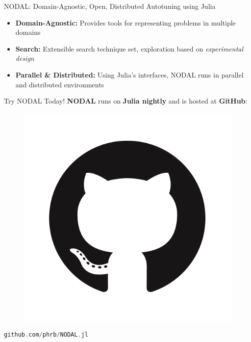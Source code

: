 \documentclass{beamer}
\begin{document}
\begin{frame}[fragile]
\begin{columns}[t]
\begin{column}{.48\linewidth}
\begin{block}{\Large NODAL: Domain-Agnostic, Open, Distributed
            Autotuning using Julia}
            \begin{itemize}
                \justifying\item \textbf{Domain-Agnostic:} Provides tools for representing
                    problems in multiple domains
                \justifying\item \textbf{Search:} Extensible search technique set,
                    exploration based on \emph{experimental design}
                \justifying\item \textbf{Parallel \& Distributed:} Using Julia's interfaces,
                    NODAL runs in parallel and distributed environments
            \end{itemize}
        \end{block}
        \begin{block}{\Large Try NODAL Today!}
            \justifying
            \large
            \textbf{NODAL} runs on \textbf{Julia nightly}
            and is hosted at \textbf{GitHub}:
            \vspace{2cm}
            \begin{figure}[htpb]
                \includegraphics[width=0.2\linewidth]{github}
            \end{figure}
        \begin{lstlisting}[language=C, basicstyle=\ttfamily\large,
            numbers=none,
            frame=no, showspaces=false, showstringspaces=false,
            numberstyle=\scriptsize,
            keywords={github,com,phrb,jl},
            otherkeywords={NODAL}
        ]
        github.com/phrb/NODAL.jl
        \end{lstlisting}

            \vspace{2cm}


\end{block}
\end{column}
\end{columns}
\end{frame}
\end{document}
